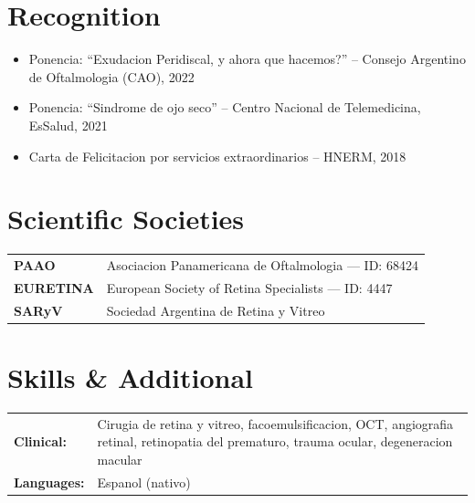 \documentclass[11pt,letterpaper]{article}
\begin{document}
\section{Recognition}

\begin{itemize}
  \item Ponencia: ``Exudacion Peridiscal, y ahora que hacemos?'' -- Consejo Argentino de Oftalmologia (CAO), 2022
  \item Ponencia: ``Sindrome de ojo seco'' -- Centro Nacional de Telemedicina, EsSalud, 2021
  \item Carta de Felicitacion por servicios extraordinarios -- HNERM, 2018
\end{itemize}

\section{Scientific Societies}

\begin{tabularx}{\textwidth}{@{}l X@{}}
\textbf{PAAO} & Asociacion Panamericana de Oftalmologia --- ID: 68424 \\
\textbf{EURETINA} & European Society of Retina Specialists --- ID: 4447 \\
\textbf{SARyV} & Sociedad Argentina de Retina y Vitreo \\
\end{tabularx}

\section{Skills \& Additional}

\begin{tabularx}{\textwidth}{@{}l X@{}}
\textbf{Clinical:} & Cirugia de retina y vitreo, facoemulsificacion, OCT, angiografia retinal, retinopatia del prematuro, trauma ocular, degeneracion macular \\
\textbf{Languages:} & Espanol (nativo) \\
\end{tabularx}
\end{document}
